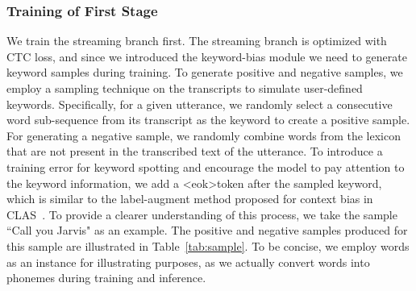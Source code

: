 \documentclass{article}
\begin{document}
\subsubsection{Training of First Stage}
We train the streaming branch first. The streaming branch is optimized with CTC loss, and since we introduced the keyword-bias module we need to generate keyword samples during training. To generate positive and negative samples, we employ a sampling technique on the transcripts to simulate user-defined keywords. Specifically, for a given utterance, we randomly select a consecutive word sub-sequence from its transcript as the keyword to create a positive sample. For generating a negative sample, we randomly combine words from the lexicon that are not present in the transcribed text of the utterance. To introduce a training error for keyword spotting and encourage the model to pay attention to the keyword information, we add a \textless eok\textgreater\enspace token after the sampled keyword, which is similar to the label-augment method proposed for context bias in CLAS~\cite{clas}.
To provide a clearer understanding of this process, we take the sample ``Call you Jarvis" as an example. The positive and negative samples produced for this sample are illustrated in Table~\ref{tab:sample}. To be concise, we employ words as an instance for illustrating purposes, as we actually convert words into phonemes during training and inference.\vspace{-10pt}
\end{document}
